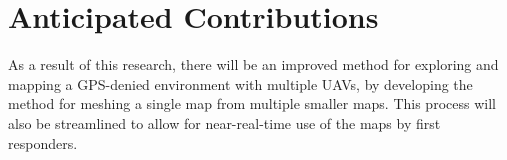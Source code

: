 \documentclass[12pt, letterpaper]{article}
\begin{document}
\section{Anticipated Contributions}

As a result of this research, there will be an improved method for exploring and mapping a GPS-denied environment with multiple UAVs, by developing the method for meshing a single map from multiple smaller maps. This process will also be streamlined to allow for near-real-time use of the maps by first responders.  

\pagebreak



\end{document}
